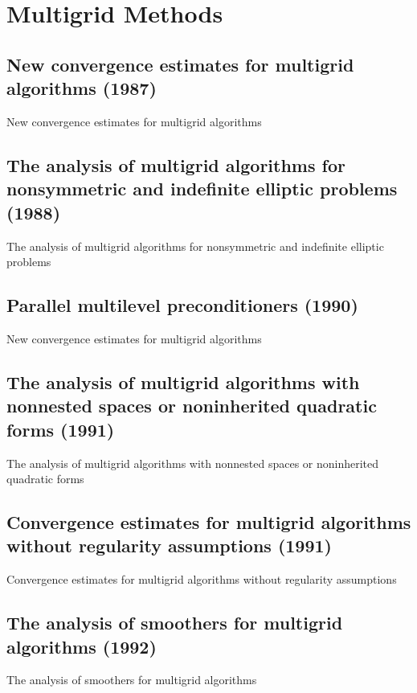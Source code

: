 \chapter{Multigrid Methods}


\section{New convergence estimates for multigrid algorithms (1987)}
New convergence estimates for multigrid algorithms\cite{bramble1987new}


\section{The analysis of multigrid algorithms for nonsymmetric and indefinite elliptic problems (1988)}
The analysis of multigrid algorithms for nonsymmetric and indefinite elliptic problems\cite{bramble1988analysis}


\section{Parallel multilevel preconditioners (1990)}
New convergence estimates for multigrid algorithms\cite{bramble1990parallel}


\section{The analysis of multigrid algorithms with nonnested spaces or noninherited quadratic forms (1991)}
The analysis of multigrid algorithms with nonnested spaces or noninherited quadratic forms\cite{bramble1991analysis}


\section{Convergence estimates for multigrid algorithms without regularity assumptions (1991)}
Convergence estimates for multigrid algorithms without regularity assumptions\cite{bramble1991convergence-a}


\section{The analysis of smoothers for multigrid algorithms (1992)}
The analysis of smoothers for multigrid algorithms\cite{bramble1992analysis}


